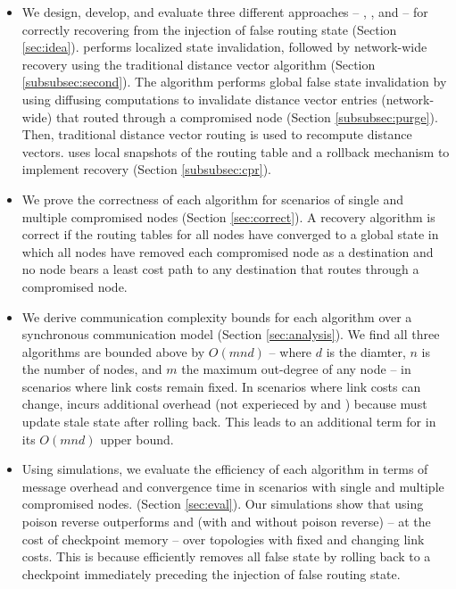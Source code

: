 \begin{itemize}

\item We design, develop, and evaluate three different approaches -- \seconds, \purges, and \cpr -- for correctly recovering from the injection of false routing state (Section \ref{sec:idea}). 
\second performs localized state invalidation, followed by network-wide recovery using the traditional distance vector algorithm (Section \ref{subsubsec:second}).
The \purge algorithm performs global false state invalidation by using diffusing computations to invalidate distance vector 
entries (network-wide) that routed through a compromised node (Section \ref{subsubsec:purge}). Then, traditional distance vector routing is used to recompute distance vectors.
\cpr uses local snapshots of the routing table and a rollback mechanism to implement recovery (Section \ref{subsubsec:cpr}). 

\item We prove the correctness of each algorithm for scenarios of single and multiple compromised nodes (Section \ref{sec:correct}). 
A recovery algorithm is correct if the routing tables for all nodes have converged to a global state in which all nodes 
have removed each compromised node as a destination and no node bears a least cost path to any destination that routes through a compromised node.

\item We derive communication complexity bounds for each algorithm over a synchronous communication model (Section \ref{sec:analysis}).  
We find all three algorithms are bounded above by $O(mnd)$ -- where $d$ is the diamter, $n$ is the number of nodes, and $m$ the maximum out-degree of any node -- in scenarios where 
link costs remain fixed.  In scenarios where link costs can change, \cpr incurs additional overhead (not experieced by \second and \purges) because \cpr must update stale
state after rolling back.  This leads to an additional term for \cpr in its $O(mnd)$ upper bound. %

\item Using simulations, we evaluate the efficiency of each algorithm in terms of message overhead and convergence time in scenarios with single and 
multiple compromised nodes. (Section \ref{sec:eval}).
Our simulations show that \cpr using poison reverse outperforms \second and \purge (with and without poison reverse) -- at the cost of checkpoint memory --
over topologies with fixed and changing link costs. This is because \cpr efficiently removes all false state by rolling back to a checkpoint
immediately preceding the injection of false routing state. 


\end{itemize}
